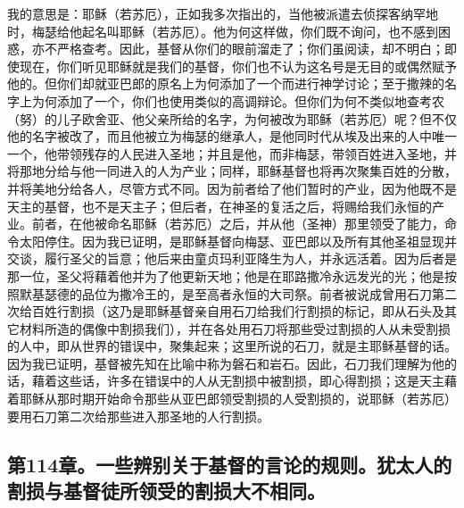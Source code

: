 我的意思是：耶稣（若苏厄），正如我多次指出的，当他被派遣去侦探客纳罕地时，梅瑟给他起名叫耶稣（若苏厄）。他为何这样做，你们既不询问，也不感到困惑，亦不严格查考。因此，基督从你们的眼前溜走了；你们虽阅读，却不明白；即使现在，你们听见耶稣就是我们的基督，你们也不认为这名号是无目的或偶然赋予他的。但你们却就亚巴郎的原名上为何添加了一个而进行神学讨论；至于撒辣的名字上为何添加了一个，你们也使用类似的高调辩论。但你们为何不类似地查考农（努）的儿子欧舍亚、他父亲所给的名字，为何被改为耶稣（若苏厄）呢？但不仅他的名字被改了，而且他被立为梅瑟的继承人，是他同时代从埃及出来的人中唯一一个，他带领残存的人民进入圣地；并且是他，而非梅瑟，带领百姓进入圣地，并将那地分给与他一同进入的人为产业；同样，耶稣基督也将再次聚集百姓的分散，并将美地分给各人，尽管方式不同。因为前者给了他们暂时的产业，因为他既不是天主的基督，也不是天主子；但后者，在神圣的复活之后，将赐给我们永恒的产业。前者，在他被命名耶稣（若苏厄）之后，并从他（圣神）那里领受了能力，命令太阳停住。因为我已证明，是耶稣基督向梅瑟、亚巴郎以及所有其他圣祖显现并交谈，履行圣父的旨意；他后来由童贞玛利亚降生为人，并永远活着。因为后者是那一位，圣父将藉着他并为了他更新天地；他是在耶路撒冷永远发光的光；他是按照默基瑟德的品位为撒冷王的，是至高者永恒的大司祭。前者被说成曾用石刀第二次给百姓行割损（这乃是耶稣基督亲自用石刀给我们行割损的标记，即从石头及其它材料所造的偶像中割损我们），并在各处用石刀将那些受过割损的人从未受割损的人中，即从世界的错误中，聚集起来；这里所说的石刀，就是主耶稣基督的话。因为我已证明，基督被先知在比喻中称为磐石和岩石。因此，石刀我们理解为他的话，藉着这些话，许多在错误中的人从无割损中被割损，即心得割损；这是天主藉着耶稣从那时期开始命令那些从亚巴郎领受割损的人受割损的，说耶稣（若苏厄）要用石刀第二次给那些进入那圣地的人行割损。\par


\subsection{第114章。一些辨别关于基督的言论的规则。犹太人的割损与基督徒所领受的割损大不相同。}

